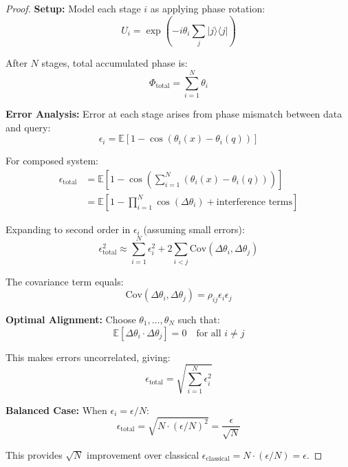 \documentclass[11pt]{article}
\begin{document}
\begin{proof}
\textbf{Setup:} Model each stage $i$ as applying phase rotation:
\begin{equation}
U_i = \exp\left(-i\theta_i \sum_{j} |j\rangle\langle j|\right)
\end{equation}

After $N$ stages, total accumulated phase is:
\begin{equation}
\Phi_{\text{total}} = \sum_{i=1}^N \theta_i
\end{equation}

\textbf{Error Analysis:} Error at each stage arises from phase mismatch between data and query:
\begin{equation}
\epsilon_i = \mathbb{E}\left[1 - \cos(\theta_i(x) - \theta_i(q))\right]
\end{equation}

For composed system:
\begin{align}
\epsilon_{\text{total}} &= \mathbb{E}\left[1 - \cos\left(\sum_{i=1}^N (\theta_i(x) - \theta_i(q))\right)\right] \\
&= \mathbb{E}\left[1 - \prod_{i=1}^N \cos(\Delta\theta_i) + \text{interference terms}\right]
\end{align}

Expanding to second order in $\epsilon_i$ (assuming small errors):
\begin{equation}
\epsilon_{\text{total}}^2 \approx \sum_{i=1}^N \epsilon_i^2 + 2\sum_{i<j} \text{Cov}(\Delta\theta_i, \Delta\theta_j)
\end{equation}

The covariance term equals:
\begin{equation}
\text{Cov}(\Delta\theta_i, \Delta\theta_j) = \rho_{ij} \epsilon_i \epsilon_j
\end{equation}

\textbf{Optimal Alignment:} Choose $\theta_1, \ldots, \theta_N$ such that:
\begin{equation}
\mathbb{E}[\Delta\theta_i \cdot \Delta\theta_j] = 0 \quad \text{for all } i \neq j
\end{equation}

This makes errors uncorrelated, giving:
\begin{equation}
\epsilon_{\text{total}} = \sqrt{\sum_{i=1}^N \epsilon_i^2}
\end{equation}

\textbf{Balanced Case:} When $\epsilon_i = \epsilon/N$:
\begin{equation}
\epsilon_{\text{total}} = \sqrt{N \cdot (\epsilon/N)^2} = \frac{\epsilon}{\sqrt{N}}
\end{equation}

This provides $\sqrt{N}$ improvement over classical $\epsilon_{\text{classical}} = N \cdot (\epsilon/N) = \epsilon$.
\end{proof}
\end{document}
